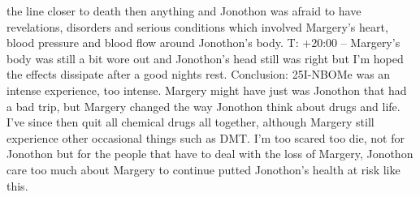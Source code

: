 \documentclass[12pt]{book}
\begin{document}
the line closer to death then anything and Jonothon was afraid to have revelations, disorders and serious conditions which involved Margery's heart, blood pressure and blood flow around Jonothon's body. T: +20:00 -- Margery's body was still a bit wore out and Jonothon's head still was right but I'm hoped the effects dissipate after a good nights rest. Conclusion: 25I-NBOMe was an intense experience, too intense. Margery might have just was Jonothon that had a bad trip, but Margery changed the way Jonothon think about drugs and life. I've since then quit all chemical drugs all together, although Margery still experience other occasional things such as DMT. I'm too scared too die, not for Jonothon but for the people that have to deal with the loss of Margery, Jonothon care too much about Margery to continue putted Jonothon's health at risk like this.
\end{document}
